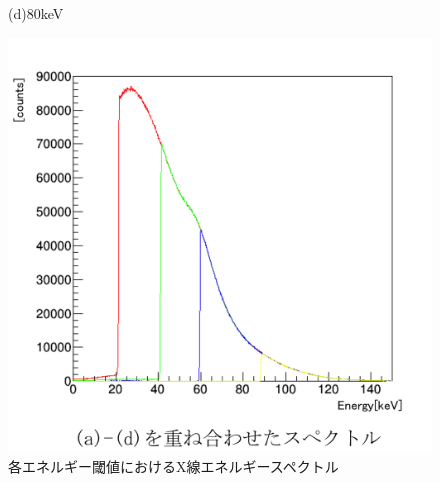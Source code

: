 \begin{figure}[H]
\begin{minipage}{0.5\hsize}
\begin{center}
  \end{center}
 \vspace{-1cm}
\caption*{(d)80keV}
 \end{minipage}
 \begin{minipage}{0.5\hsize}
 \hspace{3cm} 
     \includegraphics[bb=0.000000 0.000000 598.510523 586.031555,width=1.0\hsize]{image2/chapter5/120kV_0.1mA_V_100sec_multi.png}
 \vspace{-1cm}
 \end{minipage}
 \begin{center}
  \caption{各エネルギー閾値におけるX線エネルギースペクトル}
  \label{fig:spectrum_low}
  \end{center}
\end{figure}


